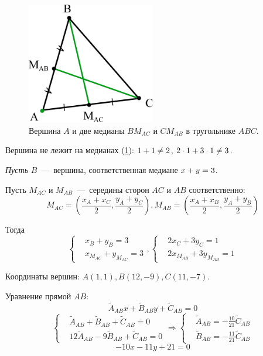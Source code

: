 \documentclass[a4paper,12pt]{article}
\begin{document}
  \begin{solution}
    \begin{figure}[h]
      \centering
      
      \includegraphics[width=0.5\textwidth]{5-17}
      
      \caption{Вершина $A$ и две медианы $BM_{AC}$ и $CM_{AB}$ в тругольнике $ABC$.}
      \label{fig:5-17}
    \end{figure}
  
    Вершина не лежит на медианах (\ref{fig:5-17}): $1 \hm+ 1 \hm{\not=} 2$, $2 \hm\cdot 1 \hm+ 3 \hm\cdot 1 \hm{\not=} 3$.

    \emph{Пусть} $B$~---~вершина, соответственная медиане $x \hm+ y \hm= 3$.
    
    Пусть $M_{AC}$ и $M_{AB}$~---~середины сторон $AC$ и $AB$ соответственно:
    \[
        M_{AC} = \left(\frac{x_A + x_C}{2}, \frac{y_A + y_C}{2}\right),
        M_{AB} = \left(\frac{x_A + x_B}{2}, \frac{y_A + y_B}{2}\right)
    \]
    
    Тогда
    \[
      \left\{
      \begin{aligned}
        &x_B + y_B = 3\\
        &x_{M_{AC}} + y_{M_{AC}} = 3
      \end{aligned}
      \right.,
      \left\{
      \begin{aligned}
        &2x_C + 3y_C = 1\\
        &2x_{M_{AB}} + 3y_{M_{AB}} = 1
      \end{aligned}
      \right.
    \]
    
    Координаты вершин: $A(1, 1), B(12, -9), C(11, -7)$.
    
    Уравнение прямой $AB$:
    \[
      \widetilde A_{AB} x + \widetilde B_{AB} y + \widetilde C_{AB} = 0
    \]
    \[
      \left\{
        \begin{aligned}
          &\widetilde A_{AB} + \widetilde B_{AB} + \widetilde C_{AB} = 0\\
          &12 \widetilde A_{AB} -9 \widetilde B_{AB} + \widetilde C_{AB} = 0
        \end{aligned}
      \right.
      \Rightarrow
      \left\{
        \begin{aligned}
          &\widetilde A_{AB} = -\frac{10}{21}\widetilde C_{AB}\\
          &\widetilde B_{AB} = -\frac{11}{21}\widetilde C_{AB}
        \end{aligned}
      \right.
    \]
    \[
      -10x - 11y + 21 = 0
    \]
    

\end{solution}
\end{document}
